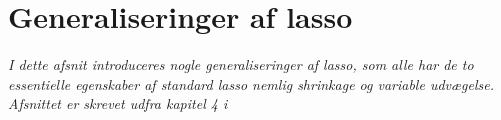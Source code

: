 \section{Generaliseringer af lasso}
\textit{I dette afsnit introduceres nogle generaliseringer af lasso, som alle har de to essentielle egenskaber af standard lasso nemlig shrinkage og variable udvægelse.
Afsnittet er skrevet udfra kapitel 4 i \citep{hastie}}





